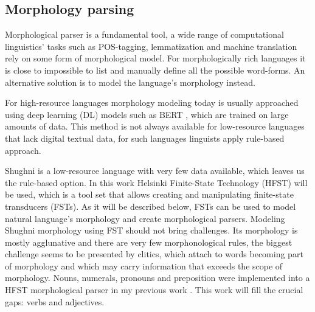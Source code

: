\subsection{Morphology parsing}
\par Morphological parser is a fundamental tool, a wide range of computational linguistics' tasks such as POS-tagging, lemmatization and machine translation rely on some form of morphological model. For morphologically rich languages it is close to impossible to list and manually define all the possible word-forms. An alternative solution is to model the language's morphology instead.
\par For high-resource languages morphology modeling today is usually approached using deep learning (DL) models such as BERT \parencite{devlin-etal-2019-bert}, which are trained on large amounts of data. This method is not always available for low-resource languages that lack digital textual data, for such languages linguists apply rule-based approach.
\par Shughni is a low-resource language with very few data available, which leaves us the rule-based option. In this work Helsinki Finite-State Technology (HFST) will be used, which is a tool set that allows creating and manipulating finite-state transducers (FSTs). As it will be described below, FSTs can be used to model natural language's morphology and create morphological parsers. Modeling Shughni morphology using FST should not bring challenges. Its morphology is mostly agglunative and there are very few morphonological rules, the biggest challenge seems to be presented by clitics, which attach to words becoming part of morphology and which may carry information that exceeds the scope of morphology. Nouns, numerals, pronouns and preposition were implemented into a HFST morphological parser in my previous work \parencite{osorgin_2024_twol}. This work will fill the crucial gaps: verbs and adjectives.